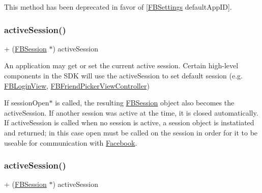 This method has been deprecated in favor of \mbox{[}\hyperlink{interfaceFBSettings}{F\+B\+Settings} default\+App\+ID\mbox{]}. \mbox{\label{interfaceFBSession_aaf6863ab39e2f67733792453874d3870}} 
\subsubsection{\texorpdfstring{active\+Session()}{activeSession()}\hspace{0.1cm}{\footnotesize\ttfamily [1/5]}}
{\footnotesize\ttfamily + (\hyperlink{interfaceFBSession}{F\+B\+Session} $\ast$) active\+Session \begin{DoxyParamCaption}{ }\end{DoxyParamCaption}}

An application may get or set the current active session. Certain high-\/level components in the S\+DK will use the active\+Session to set default session (e.\+g. {\ttfamily \hyperlink{interfaceFBLoginView}{F\+B\+Login\+View}}, {\ttfamily \hyperlink{interfaceFBFriendPickerViewController}{F\+B\+Friend\+Picker\+View\+Controller}})

If session\+Open$\ast$ is called, the resulting {\ttfamily \hyperlink{interfaceFBSession}{F\+B\+Session}} object also becomes the active\+Session. If another session was active at the time, it is closed automatically. If active\+Session is called when no session is active, a session object is instatiated and returned; in this case open must be called on the session in order for it to be useable for communication with \hyperlink{interfaceFacebook}{Facebook}. \mbox{\label{interfaceFBSession_aaf6863ab39e2f67733792453874d3870}} 
\subsubsection{\texorpdfstring{active\+Session()}{activeSession()}\hspace{0.1cm}{\footnotesize\ttfamily [2/5]}}
{\footnotesize\ttfamily + (\hyperlink{interfaceFBSession}{F\+B\+Session} $\ast$) active\+Session \begin{DoxyParamCaption}{ }\end{DoxyParamCaption}}

